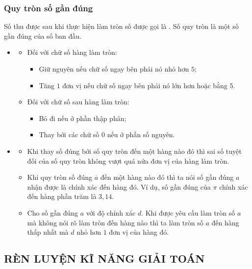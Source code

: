 \subsubsection{Quy tròn số gần đúng}
Số thu được sau khi thực hiện làm tròn số được gọi là . Số quy tròn là một số gần đúng của số ban đầu.
\begin{itemize}
	\item [\iconMT] 
	\begin{itemize}
		\item [\ding{172}] Đối với chữ số hàng làm tròn:
		\begin{boxkn}
			\begin{itemize}
				\item Giữ nguyên nếu chữ số ngay bên phải nó nhỏ hơn $5$;
				\item Tăng $1$ đơn vị nếu chữ số ngay bên phải nó lớn hơn hoặc bằng $5$.
			\end{itemize}
		\end{boxkn}
		\item [\ding{173}] Đối với chữ số sau hàng làm tròn:
		\begin{boxkn}
			\begin{itemize}
				\item Bỏ đi nếu ở phần thập phân;
				\item Thay bởi các chữ số $0$ nếu ở phần số nguyên.
			\end{itemize}
		\end{boxkn}
	\end{itemize}
	\item [\iconMT] 
	\begin{itemize}
		\item[\ding{172}]  Khi thay số đúng bởi số quy tròn đến một hàng nào đó thì sai số tuyệt đối của số quy tròn không vượt quá nửa đơn vị của hàng làm tròn.
		\item[\ding{173}] Khi quy tròn số đúng $\overline{a}$ đến một hàng nào đó thì ta nói số gần đúng $a$ nhận được là chính xác đến hàng đó. Ví dụ, số gần đúng của $\pi$ chính xác đến hàng phần trăm là $3,14$.
		\item[\ding{174}] Cho số gần đúng $a$ với độ chính xác $d$. Khi được yêu cầu làm tròn số $a$ mà không nói rõ làm tròn đến hàng nào thì ta làm tròn số $a$ đến hàng thấp nhất mà $d$ nhỏ hơn $1$ đơn vị của hàng đó.
	\end{itemize}
\end{itemize}
\subsection{RÈN LUYỆN KĨ NĂNG GIẢI TOÁN}

